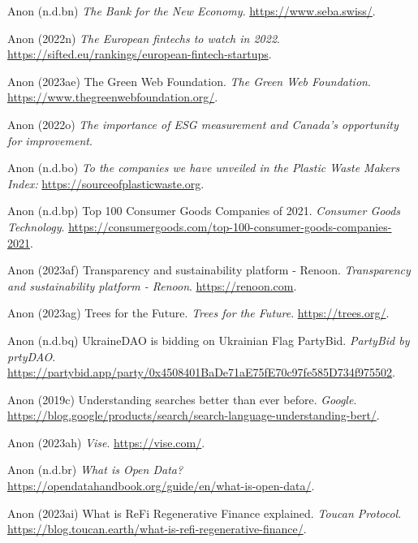\documentclass[
  letterpaper,
  DIV=11,
  numbers=noendperiod]{scrartcl}
\newlength{\cslhangindent}
\newenvironment{CSLReferences}[2] %
 {\begin{list}{}{%
  \setlength{\itemindent}{0pt}
  \setlength{\leftmargin}{0pt}
  \setlength{\parsep}{0pt}
  \ifodd #1
   \setlength{\leftmargin}{\cslhangindent}
   \setlength{\itemindent}{-1\cslhangindent}
  \fi
  \setlength{\itemsep}{#2\baselineskip}}}
 {\end{list}}
\begin{document}
\begin{CSLReferences}{0}{1}
Anon (n.d.bn) \emph{The {Bank} for the {New Economy}}.
\url{https://www.seba.swiss/}.

Anon (2022n) \emph{The {European} fintechs to watch in 2022}.
\url{https://sifted.eu/rankings/european-fintech-startups}.

Anon (2023ae) The {Green Web Foundation}. \emph{The Green Web
Foundation}. \url{https://www.thegreenwebfoundation.org/}.

Anon (2022o) \emph{The importance of {ESG} measurement and {Canada}'s
opportunity for improvement}.

Anon (n.d.bo) \emph{To the companies we have unveiled in the {Plastic
Waste Makers Index}:} \url{https://sourceofplasticwaste.org}.

Anon (n.d.bp) Top 100 {Consumer Goods Companies} of 2021. \emph{Consumer
Goods Technology}.
\url{https://consumergoods.com/top-100-consumer-goods-companies-2021}.

Anon (2023af) Transparency and sustainability platform - {Renoon}.
\emph{Transparency and sustainability platform - Renoon}.
\url{https://renoon.com}.

Anon (2023ag) Trees for the {Future}. \emph{Trees for the Future}.
\url{https://trees.org/}.

Anon (n.d.bq) {UkraineDAO} is bidding on {Ukrainian Flag} {\textbar}
{PartyBid}. \emph{PartyBid by prtyDAO}.
\url{https://partybid.app/party/0x4508401BaDe71aE75fE70c97fe585D734f975502}.

Anon (2019c) Understanding searches better than ever before.
\emph{Google}.
\url{https://blog.google/products/search/search-language-understanding-bert/}.

Anon (2023ah) \emph{Vise}. \url{https://vise.com/}.

Anon (n.d.br) \emph{What is {Open Data}?}
\url{https://opendatahandbook.org/guide/en/what-is-open-data/}.

Anon (2023ai) What is {ReFi} {\textbar} {Regenerative Finance}
explained. \emph{Toucan Protocol}.
\url{https://blog.toucan.earth/what-is-refi-regenerative-finance/}.


\end{CSLReferences}
\end{document}
